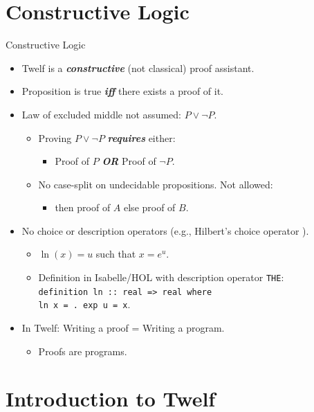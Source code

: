 \documentclass{beamer}
\renewcommand{\emph}[1]{\textbf{\textit{#1}}}
\begin{document}
\section{Constructive Logic}

\begin{frame}{Constructive Logic}
\begin{itemize}
\item Twelf is a \emph{constructive} (not classical)
proof assistant.
\item Proposition is true \emph{iff} there exists a proof
of it.
\item Law of excluded middle not assumed:  $P \lor \neg P$.
  \begin{itemize}
  \item Proving $P \lor \neg P$ \emph{requires} either:
    \begin{itemize}
    \item Proof of $P$ \emph{OR} Proof of $\neg P$.
    \end{itemize}
\pause
  \item No case-split on undecidable propositions. Not allowed:
    \begin{itemize}
    \item {}
      then proof of $A$ else proof of $B$.
    \end{itemize}
  \end{itemize}
\pause
\item No choice or description operators
 (e.g., Hilbert's choice operator ).
  \begin{itemize}
  \item $\ln(x) = u$ such that $x = e^u$.
  \item Definition in Isabelle/HOL with description operator \texttt{THE}: \\
    \texttt{definition ln ::\ real => real where} \\
    \texttt{ln x = .\ exp u = x}.
  \end{itemize}
\pause
\item In Twelf: Writing a proof = Writing a program.
	\begin{itemize}
	\item Proofs are programs.
	\end{itemize}
\end{itemize}
\end{frame}

\section{Introduction to Twelf}
\end{document}
